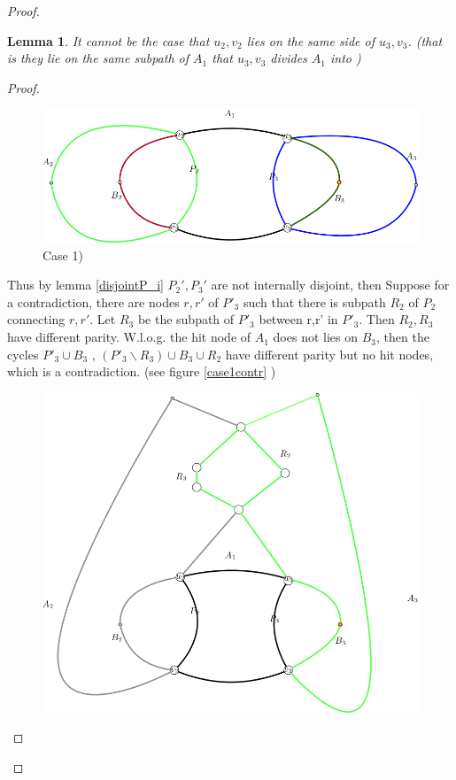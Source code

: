 \documentclass[letterpaper,11pt]{article}
\newtheorem{lemma}[theorem]{Lemma}
\newcommand{\0}{\mathbb{0}}
\newcommand{\1}{\mathbb{1}}
\begin{document}
\begin{proof}
\begin{lemma}\label{}
It cannot be the case that  %
$u_2,v_2$ lies on the same side of $u_3,v_3$. (that is  they lie on the same subpath of $A_1$ that $u_3,v_3$ divides $A_1$ into )
\end{lemma} 
\begin{proof}
\begin{figure}[h]
        \includegraphics[scale=0.3]{Case1.png}
    \caption{Case 1)}
\end{figure} 
Thus by lemma \ref{disjointP_i} $P_2', P_3'$ are not internally disjoint, then %
Suppose for a contradiction, there are nodes $r,r'$ of $P'_3$ such that there is subpath $R_2$ of $P_2$ connecting $r,r'$. Let $R_3$ be the subpath of $P'_3$ between r,r' in $P'_3$.  Then $R_2 , R_3 $ have different parity. W.l.o.g. the hit node of $A_1$ does not lies on $B_3$, then the cycles $ P'_3 \cup B_3 $ , $ ( P'_3  \backslash R_3 ) \cup B_3 \cup R_2 $ have different parity but no hit nodes, which is a contradiction. (see figure \ref{case1contr} )
\begin{figure}[h]
       \includegraphics[scale=0.23]{Case1Contr.png}

\end{figure}
\end{proof}
\end{proof}
\end{document}
